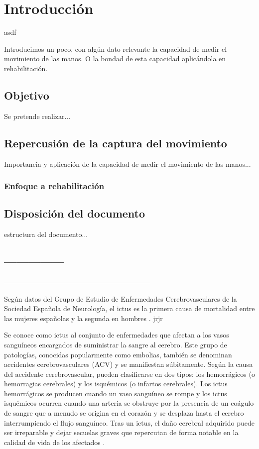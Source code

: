 \chapter{Introducción}

asdf

Introducimos un poco, con algún dato relevante la capacidad de medir el movimiento de las manos. 
O la bondad de esta capacidad aplicándola en rehabilitación.


\section{Objetivo}\label{sec:objetivos1}
Se pretende realizar...


\section{Repercusión de la captura del movimiento}
\label{sec:trascendencia1}

Importancia y aplicación de la capacidad de medir el movimiento de las manos...

\subsection{Enfoque a rehabilitación}
\label{sec:enfoque1}

\section{Disposición del documento}
\label{sec:disposicion1}

estructura del documento...

\section{---------------}

---------------------------------------------------------------

Según datos del Grupo de Estudio de Enfermedades Cerebrovasculares de la Sociedad Española de Neurología, el ictus es la primera causa de mortalidad entre las mujeres españolas y la segunda en hombres \cite{ictuss}. jrjr

Se conoce como ictus al conjunto de enfermedades que afectan a los vasos sanguíneos encargados de suministrar la sangre al cerebro. Este grupo de patologías, conocidas popularmente como embolias, también se denominan accidentes cerebrovasculares (ACV) y se manifiestan súbitamente. Según la causa del accidente cerebrovascular, pueden clasificarse en dos tipos: los hemorrágicos (o hemorragias cerebrales) y los isquémicos (o infartos cerebrales). Los ictus hemorrágicos se producen cuando un vaso sanguíneo se rompe y los ictus isquémicos ocurren cuando una arteria se obstruye por la presencia de un coágulo de sangre que a menudo se origina en el corazón y se desplaza hasta el cerebro interrumpiendo el flujo sanguíneo. Tras un ictus, el daño cerebral adquirido puede ser irreparable y dejar secuelas graves que repercutan de forma notable en la calidad de vida de los afectados \cite{ictus_def}.

